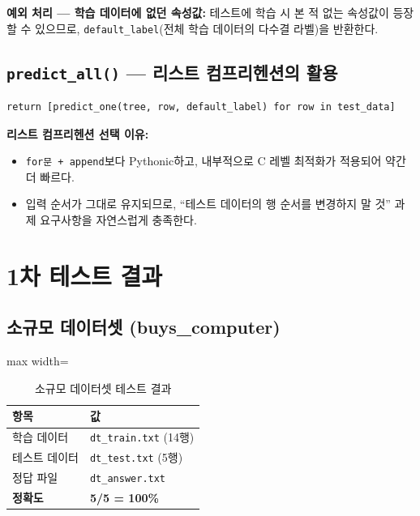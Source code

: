 \documentclass[12pt, a4paper]{article}
\newcommand{\cmark}{\ding{51}}
\begin{document}
\noindent\textbf{예외 처리 --- 학습 데이터에 없던 속성값:}
테스트에 학습 시 본 적 없는 속성값이 등장할 수 있으므로, \texttt{default\_label}(전체 학습 데이터의 다수결 라벨)을 반환한다.


\subsection{\texttt{predict\_all()} --- 리스트 컴프리헨션의 활용}

\begin{verbatim}
return [predict_one(tree, row, default_label) for row in test_data]
\end{verbatim}

\noindent\textbf{리스트 컴프리헨션 선택 이유:}
\begin{itemize}
    \item \texttt{for문 + append}보다 Pythonic하고, 내부적으로 C 레벨 최적화가 적용되어 약간 더 빠르다.
    \item 입력 순서가 그대로 유지되므로, ``테스트 데이터의 행 순서를 변경하지 말 것'' 과제 요구사항을 자연스럽게 충족한다.
\end{itemize}


\section{1차 테스트 결과}

\subsection{소규모 데이터셋 (buys\_computer)}

\begin{table}[h]
\centering
\begin{adjustbox}{max width=\textwidth}
\begin{tabular}{ll}
\toprule
\textbf{항목} & \textbf{값} \\
\midrule
학습 데이터   & \texttt{dt\_train.txt} (14행) \\
테스트 데이터 & \texttt{dt\_test.txt} (5행) \\
정답 파일     & \texttt{dt\_answer.txt} \\
\textbf{정확도} & \textbf{5/5 = 100\%} \cmark \\
\bottomrule
\end{tabular}
\end{adjustbox}
\caption{소규모 데이터셋 테스트 결과}
\end{table}
\end{document}
